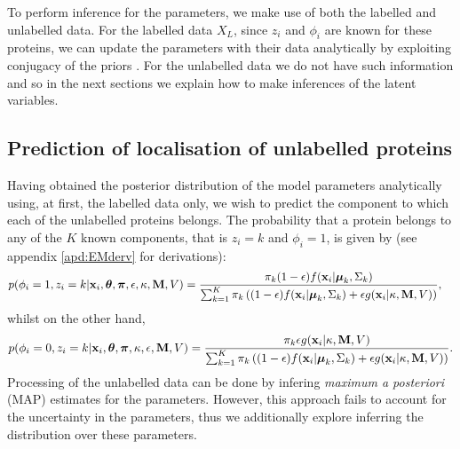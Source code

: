 \documentclass[12pt,english]{article}\usepackage[]{graphicx}\usepackage[]{color}
\begin{document}
To perform inference for the parameters, we make use of both the labelled and unlabelled data. For the labelled data $X_L$, since $z_i$ and $\phi_i$ are
known for these proteins, we can update the parameters
with their data analytically by exploiting conjugacy of the priors \citep[see, for example,][]{Gelman:1995}. For the unlabelled data we do not have such
information and so in the next sections we explain how to make inferences of the latent variables.

\subsection{Prediction of localisation of unlabelled proteins}
Having obtained the posterior distribution of the model parameters analytically using, at first, the labelled data only, we wish to predict the component to which each of the unlabelled proteins belongs. The probability that a protein belongs to any of the $K$ known components, that is $z_i = k$ and $\phi_i = 1$, is given by (see appendix \ref{apd:EMderv} for derivations):
\begin{equation}\label{equation::estep1}
\begin{split}
p(\phi_i = 1, z_i = k|{\bf x}_i, \boldsymbol{\theta}, \boldsymbol{\pi} , \epsilon,\kappa, {\bf M}, V)  & = \frac{\pi_k(1-\epsilon)f({\bf x}_i|\boldsymbol{\mu}_k, \Sigma_{k})}{\sum_{k=1}^{K}\pi_k\left((1-\epsilon) f({\bf x}_i|\boldsymbol{\mu}_k, \Sigma_k) + \epsilon g({\bf x}_i|\kappa, {\bf M}, V)\right)},
\end{split}
\end{equation}
whilst on the other hand,
\begin{equation}\label{equation::estep2}
\begin{split}
p(\phi_i = 0, z_i = k|{\bf x}_i, \boldsymbol{\theta}, \boldsymbol{\pi},\kappa, \epsilon, {\bf M}, V)  = \frac{\pi_k \epsilon g({\bf x}_i|\kappa, {\bf M}, V)}{\sum_{k=1}^{K}\pi_k\left((1-\epsilon) f({\bf x}_i|\boldsymbol{\mu}_k, \Sigma_k) + \epsilon g({\bf x}_i|\kappa, {\bf M}, V)\right)}.
\end{split}
\end{equation}
Processing of the unlabelled data can be done by infering {\em maximum a posteriori} (MAP) estimates for the parameters. However, this approach fails to account for
the uncertainty in the parameters, thus we additionally explore inferring the distribution over these parameters.
\end{document}
